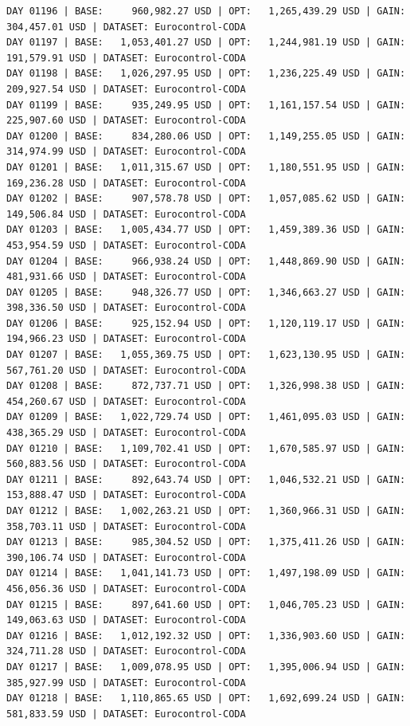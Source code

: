 \documentclass[11pt,a4paper]{article}
\begin{document}
\begin{verbatim}
DAY 01196 | BASE:     960,982.27 USD | OPT:   1,265,439.29 USD | GAIN: 304,457.01 USD | DATASET: Eurocontrol-CODA
DAY 01197 | BASE:   1,053,401.27 USD | OPT:   1,244,981.19 USD | GAIN: 191,579.91 USD | DATASET: Eurocontrol-CODA
DAY 01198 | BASE:   1,026,297.95 USD | OPT:   1,236,225.49 USD | GAIN: 209,927.54 USD | DATASET: Eurocontrol-CODA
DAY 01199 | BASE:     935,249.95 USD | OPT:   1,161,157.54 USD | GAIN: 225,907.60 USD | DATASET: Eurocontrol-CODA
DAY 01200 | BASE:     834,280.06 USD | OPT:   1,149,255.05 USD | GAIN: 314,974.99 USD | DATASET: Eurocontrol-CODA
DAY 01201 | BASE:   1,011,315.67 USD | OPT:   1,180,551.95 USD | GAIN: 169,236.28 USD | DATASET: Eurocontrol-CODA
DAY 01202 | BASE:     907,578.78 USD | OPT:   1,057,085.62 USD | GAIN: 149,506.84 USD | DATASET: Eurocontrol-CODA
DAY 01203 | BASE:   1,005,434.77 USD | OPT:   1,459,389.36 USD | GAIN: 453,954.59 USD | DATASET: Eurocontrol-CODA
DAY 01204 | BASE:     966,938.24 USD | OPT:   1,448,869.90 USD | GAIN: 481,931.66 USD | DATASET: Eurocontrol-CODA
DAY 01205 | BASE:     948,326.77 USD | OPT:   1,346,663.27 USD | GAIN: 398,336.50 USD | DATASET: Eurocontrol-CODA
DAY 01206 | BASE:     925,152.94 USD | OPT:   1,120,119.17 USD | GAIN: 194,966.23 USD | DATASET: Eurocontrol-CODA
DAY 01207 | BASE:   1,055,369.75 USD | OPT:   1,623,130.95 USD | GAIN: 567,761.20 USD | DATASET: Eurocontrol-CODA
DAY 01208 | BASE:     872,737.71 USD | OPT:   1,326,998.38 USD | GAIN: 454,260.67 USD | DATASET: Eurocontrol-CODA
DAY 01209 | BASE:   1,022,729.74 USD | OPT:   1,461,095.03 USD | GAIN: 438,365.29 USD | DATASET: Eurocontrol-CODA
DAY 01210 | BASE:   1,109,702.41 USD | OPT:   1,670,585.97 USD | GAIN: 560,883.56 USD | DATASET: Eurocontrol-CODA
DAY 01211 | BASE:     892,643.74 USD | OPT:   1,046,532.21 USD | GAIN: 153,888.47 USD | DATASET: Eurocontrol-CODA
DAY 01212 | BASE:   1,002,263.21 USD | OPT:   1,360,966.31 USD | GAIN: 358,703.11 USD | DATASET: Eurocontrol-CODA
DAY 01213 | BASE:     985,304.52 USD | OPT:   1,375,411.26 USD | GAIN: 390,106.74 USD | DATASET: Eurocontrol-CODA
DAY 01214 | BASE:   1,041,141.73 USD | OPT:   1,497,198.09 USD | GAIN: 456,056.36 USD | DATASET: Eurocontrol-CODA
DAY 01215 | BASE:     897,641.60 USD | OPT:   1,046,705.23 USD | GAIN: 149,063.63 USD | DATASET: Eurocontrol-CODA
DAY 01216 | BASE:   1,012,192.32 USD | OPT:   1,336,903.60 USD | GAIN: 324,711.28 USD | DATASET: Eurocontrol-CODA
DAY 01217 | BASE:   1,009,078.95 USD | OPT:   1,395,006.94 USD | GAIN: 385,927.99 USD | DATASET: Eurocontrol-CODA
DAY 01218 | BASE:   1,110,865.65 USD | OPT:   1,692,699.24 USD | GAIN: 581,833.59 USD | DATASET: Eurocontrol-CODA

\end{verbatim}
\end{document}
